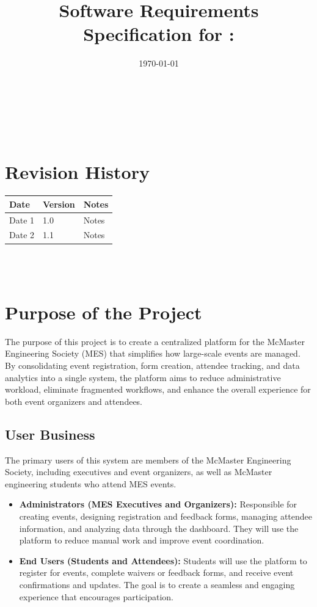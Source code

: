 \documentclass[12pt]{article}
\begin{document}
\title{Software Requirements Specification for \progname: \prjdesc}
\author{\authname}
\date{\today}

\maketitle
~\newpage


\tableofcontents

~\newpage

\section*{Revision History}

\begin{tabularx}{\textwidth}{p{3cm}p{2cm}X}
\toprule {\textbf{Date}} & {\textbf{Version}} & {\textbf{Notes}}\\
\midrule
Date 1 & 1.0 & Notes\\
Date 2 & 1.1 & Notes\\
\bottomrule
\end{tabularx}

~\\

~\newpage
\section{Purpose of the Project}

The purpose of this project is to create a centralized platform for the McMaster Engineering Society (MES) that simplifies how large-scale events are managed. By consolidating event registration, form creation, attendee tracking, and data analytics into a single system, the platform aims to reduce administrative workload, eliminate fragmented workflows, and enhance the overall experience for both event organizers and attendees.

\subsection{User Business}

The primary users of this system are members of the McMaster Engineering Society, including executives and event organizers, as well as McMaster engineering students who attend MES events.  

\begin{itemize}
    \item \textbf{Administrators (MES Executives and Organizers):} Responsible for creating events, designing registration and feedback forms, managing attendee information, and analyzing data through the dashboard. They will use the platform to reduce manual work and improve event coordination.
    \item \textbf{End Users (Students and Attendees):} Students will use the platform to register for events, complete waivers or feedback forms, and receive event confirmations and updates. The goal is to create a seamless and engaging experience that encourages participation.
\end{itemize}
\end{document}

